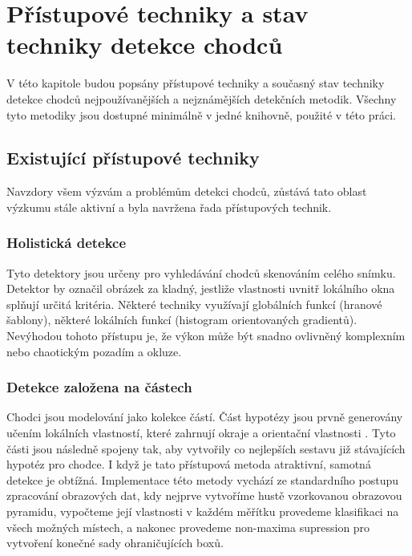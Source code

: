 \section{Přístupové techniky a stav techniky detekce chodců}
V této kapitole budou popsány přístupové techniky a současný stav techniky detekce chodců nejpoužívanějších a nejznámějších detekčních metodik. Všechny tyto metodiky jsou dostupné minimálně v jedné knihovně, použité v této práci.  

\subsection{Existující přístupové techniky}
Navzdory všem výzvám a problémům detekci chodců, zůstává tato oblast výzkumu stále aktivní a byla navržena řada přístupových technik.

\subsubsection{Holistická detekce}

Tyto detektory jsou určeny pro vyhledávání chodců skenováním celého snímku. Detektor by označil obrázek za kladný, jestliže vlastnosti uvnitř lokálního okna splňují určitá kritéria. Některé techniky využívají globálních funkcí (hranové šablony\cite{edgeTemplate}), některé lokálních funkcí (histogram orientovaných gradientů\cite{hog:dalal}). Nevýhodou tohoto přístupu je, že výkon může být snadno ovlivněný komplexním nebo chaotickým pozadím a okluze.

\subsubsection{Detekce založena na částech}

Chodci jsou modelování jako kolekce částí. Část hypotézy jsou prvně generovány učením lokálních vlastností, které zahrnují okraje\cite{edgelet} a orientační vlastnosti \cite{orientationFeatures}. Tyto části jsou následně spojeny tak, aby vytvořily co nejlepších sestavu již stávajících hypotéz pro chodce. I když je tato přístupová metoda atraktivní, samotná detekce je obtížná. Implementace této metody vychází ze standardního postupu zpracování obrazových dat, kdy nejprve vytvoříme hustě vzorkovanou obrazovou pyramidu, vypočteme její vlastnosti v každém měřítku provedeme klasifikaci na všech možných místech, a nakonec provedeme non-maxima supression pro vytvoření konečné sady ohraničujících boxů.\cite{partModels} 

